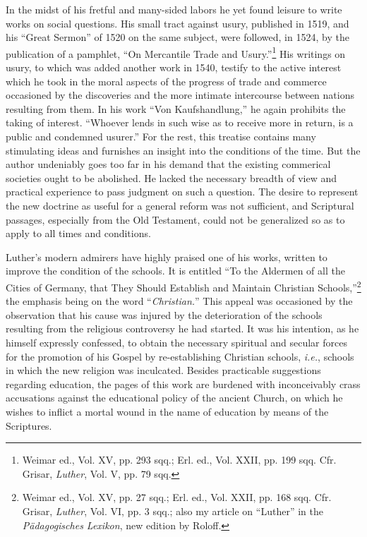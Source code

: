 In the midst of his fretful and many-sided labors he yet found
leisure to write works on social questions. His small tract against
usury, published in 1519, and his “Great Sermon” of 1520 on the
same subject, were followed, in 1524, by the publication of a
pamphlet, “On Mercantile Trade and Usury.”\footnote
{Weimar ed., Vol. XV, pp. 293 sqq.; Erl. ed., Vol. XXII, pp. 199 sqq. Cfr. Grisar,
\textit{Luther}, Vol. V, pp. 79 sqq.}
His writings on
usury, to which was added another work in 1540, testify to the
active interest which he took in the moral aspects of the progress
of trade and commerce occasioned by the discoveries and the more
intimate intercourse between nations resulting from them. In his
work “Von Kaufshandlung,” he again prohibits the taking of interest.
“Whoever lends in such wise as to receive more in return,
is a public and condemned usurer.” For the rest, this treatise
contains many stimulating ideas and furnishes an insight into
the conditions of the time. But the author undeniably goes too far in his
demand that the existing commerical societies ought to be abolished.
He lacked the necessary breadth of view and practical experience
to pass judgment on such a question. The desire to represent the new
doctrine as useful for a general reform was not sufficient, and
Scriptural passages, especially from the Old Testament, could not
be generalized so as to apply to all times and conditions.

Luther’s modern admirers have highly praised one of his works,
written to improve the condition of the schools. It is entitled “To
the Aldermen of all the Cities of Germany, that They Should Establish
and Maintain Christian Schools,”\footnote
{Weimar ed., Vol. XV, pp. 27 sqq.; Erl. ed., Vol. XXII, pp. 168 sqq. Cfr. Grisar,
\textit{Luther}, Vol. VI, pp. 3 sqq.; also my article on “Luther” in the \textit{Pädagogisches Lexikon},
new edition by Roloff.}
the emphasis being on the
word “\textit{Christian.}” This appeal was occasioned by the observation
that his cause was injured by the deterioration of the schools resulting
from the religious controversy he had started. It was his intention,
as he himself expressly confessed, to obtain the necessary spiritual
and secular forces for the promotion of his Gospel by
re-establishing Christian schools, \textit{i.e.}, schools in which the new religion
was inculcated. Besides practicable suggestions regarding education,
the pages of this work are burdened with inconceivably crass accusations
against the educational policy of the ancient Church, on which
he wishes to inflict a mortal wound in the name of education by
means of the Scriptures.


